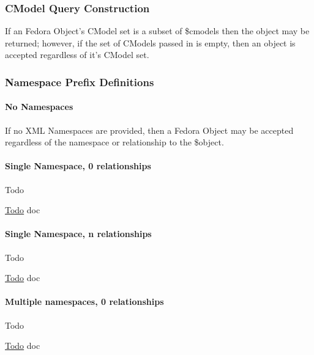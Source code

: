 \subsubsection*{C\+Model Query Construction}

If an Fedora Object's C\+Model set is a subset of \$cmodels then the object may be returned; however, if the set of C\+Models passed in is empty, then an object is accepted regardless of it's C\+Model set.

\subsubsection*{Namespace Prefix Definitions}

\paragraph*{No Namespaces}

If no X\+M\+L Namespaces are provided, then a Fedora Object may be accepted regardless of the namespace or relationship to the \$object. \paragraph*{Single Namespace, 0 relationships}

\begin{DoxyRefDesc}{Todo}
\item[\hyperlink{todo__todo000004}{Todo}]doc\end{DoxyRefDesc}


\paragraph*{Single Namespace, n relationships}

\begin{DoxyRefDesc}{Todo}
\item[\hyperlink{todo__todo000005}{Todo}]doc\end{DoxyRefDesc}


\paragraph*{Multiple namespaces, 0 relationships}

\begin{DoxyRefDesc}{Todo}
\item[\hyperlink{todo__todo000006}{Todo}]doc\end{DoxyRefDesc}


